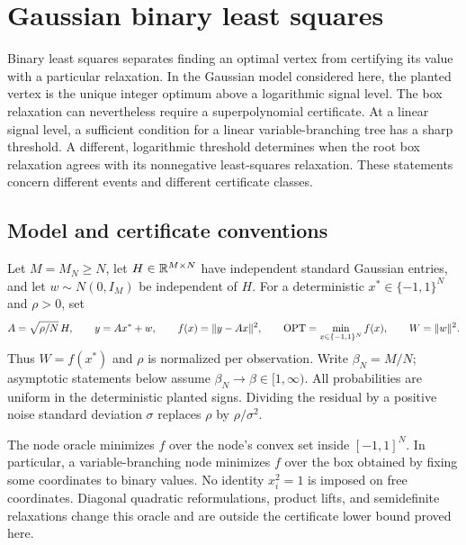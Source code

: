 \section{Gaussian binary least squares}
\label{sec:binary-least-squares}

Binary least squares separates finding an optimal vertex from certifying its
value with a particular relaxation.  In the Gaussian model considered here,
the planted vertex is the unique integer optimum above a logarithmic signal
level.  The box relaxation can nevertheless require a superpolynomial
certificate.  At a linear signal level, a sufficient condition for a linear
variable-branching tree has a sharp threshold.  A different, logarithmic
threshold determines when the root box relaxation agrees with its
nonnegative least-squares relaxation.  These statements concern different
events and different certificate classes.

\subsection{Model and certificate conventions}
\label{bls:model}

Let $M=M_N\ge N$, let $H\in\mathbb{R}^{M\times N}$ have independent standard
Gaussian entries, and let $w\sim N(0,I_M)$ be independent of $H$.  For a
deterministic $x^*\in\{-1,1\}^N$ and $\rho>0$, set
\begin{equation}
 A=\sqrt{\rho/N}\,H,\qquad y=Ax^*+w,\qquad
 f(x)=\|y-Ax\|^2,\qquad
 \operatorname{OPT}=\min_{x\in\{-1,1\}^N}f(x),\qquad W=\|w\|^2.
 \label{bls:model-equation}
\end{equation}
Thus $W=f(x^*)$ and $\rho$ is normalized per observation.  Write
$\beta_N=M/N$; asymptotic statements below assume
$\beta_N\to\beta\in[1,\infty)$.  All probabilities are uniform in the
deterministic planted signs.  Dividing the residual by a positive noise
standard deviation $\sigma$ replaces $\rho$ by $\rho/\sigma^2$.

The node oracle minimizes $f$ over the node's convex set inside
$[-1,1]^N$.  In particular, a variable-branching node minimizes $f$ over
the box obtained by fixing some coordinates to binary values.  No identity
$x_i^2=1$ is imposed on free coordinates.  Diagonal quadratic
reformulations, product lifts, and semidefinite relaxations change this
oracle and are outside the certificate lower bound proved here.

